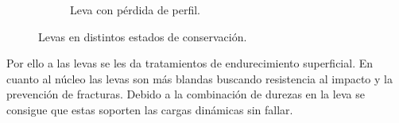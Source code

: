 \begin{figure}[H]
\begin{subfigure}[b]{0.45\textwidth}
 		\caption{Leva con pérdida de perfil.}
		\label{fig:brk_cam}
	\end{subfigure}    
	\caption{Levas en distintos estados de conservación.}
	\label{fig:cams}
\end{figure}

Por ello a las levas se les da tratamientos de endurecimiento superficial. En cuanto al núcleo las levas son más blandas buscando resistencia al impacto y la prevención de fracturas. Debido a la combinación de durezas en la leva se consigue que estas soporten las cargas dinámicas sin fallar.
